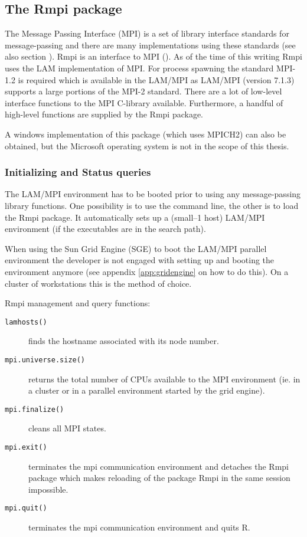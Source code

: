 \subsection{The Rmpi package}
\label{sec:Rmpi}
The Message Passing Interface (MPI) is a set of library interface
standards for message-passing and there are many implementations using
these standards (see also section \cite{sec:MPI}).
Rmpi is an interface to MPI (\cite{yu06Rmpi}). As of the time of this
writing Rmpi uses
the LAM implementation of MPI. For process spawning the standard
MPI-1.2 is required which is available in the LAM/MPI 
as LAM/MPI (version 7.1.3) supports a large portions of the MPI-2
standard. There are 
a lot of low-level interface functions to the MPI C-library available.
Furthermore, a handful of high-level functions are supplied by the
Rmpi package. 

A windows implementation of this package (which uses MPICH2)
can also be obtained, but the Microsoft operating system is not in the
scope of this thesis.

\subsubsection{Initializing and Status queries}

The LAM/MPI environment has to be booted prior to using any
message-passing library functions. One possibility is to use the
command line, the other is to load the Rmpi package. It automatically
sets up a (small--1 host) LAM/MPI environment (if the executables are
in the search path). 

When using the Sun Grid Engine (SGE) to boot the LAM/MPI parallel
environment the developer is not engaged with
setting up and booting the environment anymore (see
appendix \ref{app:gridengine} on how to do this). On a cluster of
workstations this is the method of choice. 


Rmpi management and query functions:

\begin{description}
\item[\texttt{lamhosts()}] finds the hostname associated with its node
  number.
\item[\texttt{mpi.universe.size()}] returns the total number of CPUs
  available to the MPI environment (ie. in a cluster or in a parallel
  environment started by the grid engine).
\item[\texttt{mpi.finalize()}] cleans all MPI states.
\item[\texttt{mpi.exit()}] terminates the mpi communication
  environment and detaches the Rmpi package which makes reloading of
  the package Rmpi in the same session impossible.  
\item[\texttt{mpi.quit()}] terminates the mpi communication
  environment and quits R.  
\end{description}
  

